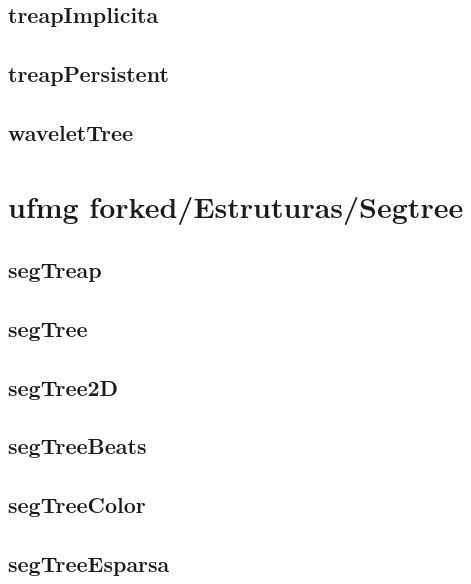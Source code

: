\subsection{treapImplicita}
\raggedbottom
\hrulefill
\subsection{treapPersistent}
\raggedbottom
\hrulefill
\subsection{waveletTree}
\raggedbottom
\hrulefill

\section{ufmg forked/Estruturas/Segtree}
\subsection{segTreap}
\raggedbottom
\hrulefill
\subsection{segTree}
\raggedbottom
\hrulefill
\subsection{segTree2D}
\raggedbottom
\hrulefill
\subsection{segTreeBeats}
\raggedbottom
\hrulefill
\subsection{segTreeColor}
\raggedbottom
\hrulefill
\subsection{segTreeEsparsa}
\raggedbottom
\hrulefill
